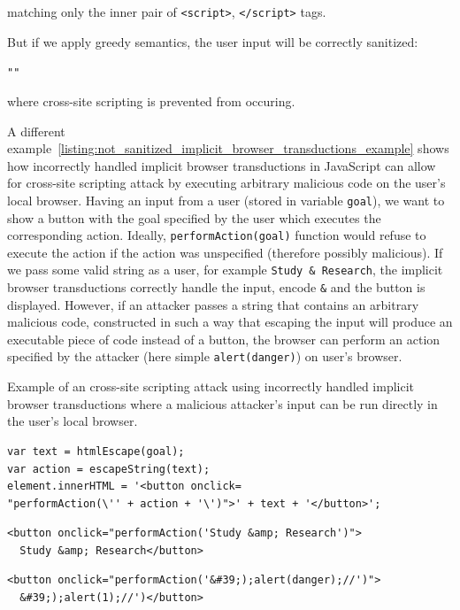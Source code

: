 matching only the inner pair of \texttt{<script>}, \texttt{</script>} tags.

But if we apply greedy semantics, the user input will be correctly sanitized:
\begin{center}
 \texttt{""}
\end{center}
where cross-site scripting is prevented from occuring.

A different example~\ref{listing:not_sanitized_implicit_browser_transductions_example} shows how incorrectly handled implicit browser transductions in JavaScript can allow for cross-site scripting attack by executing arbitrary malicious code on the user's local browser.
Having an input from a user (stored in variable \texttt{goal}), we want to show a button with the goal specified by the user which executes the corresponding action. Ideally, \texttt{performAction(goal)} function would refuse to execute the action if the action was unspecified (therefore possibly malicious).
If we pass some valid string as a user, for example \texttt{Study \& Research}, the implicit browser transductions correctly handle the input, encode \texttt{\&} and the button is displayed.
However, if an attacker passes a string that contains an arbitrary malicious code, constructed in such a way that escaping the input will produce an executable piece of code instead of a button, the browser can perform an action specified by the attacker (here simple \texttt{alert(danger)}) on user's browser.

\begin{listing}[!ht]
\caption{Example of an cross-site scripting attack using incorrectly handled implicit browser transductions where a malicious attacker's input can be run directly in the user's local browser.}
\label{listing:not_sanitized_implicit_browser_transductions_example}

    \begin{verbatim}
var text = htmlEscape(goal);
var action = escapeString(text);
element.innerHTML = '<button onclick=
"performAction(\'' + action + '\')">' + text + '</button>';
    \end{verbatim}

    \begin{verbatim}
<button onclick="performAction('Study &amp; Research')">
  Study &amp; Research</button>
    \end{verbatim}

    \begin{verbatim}
<button onclick="performAction('&#39;);alert(danger);//')">
  &#39;);alert(1);//')</button>
    \end{verbatim}
\end{listing}

